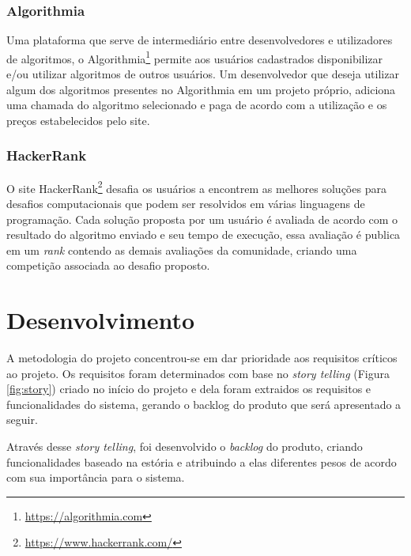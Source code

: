 \documentclass[tg]{mdtufsm}
\begin{document}
\subsection{Algorithmia}
Uma plataforma que serve de intermediário entre desenvolvedores e utilizadores de algoritmos, o Algorithmia\footnote{\url{https://algorithmia.com}} permite aos usuários cadastrados disponibilizar e/ou utilizar algoritmos de outros usuários. Um desenvolvedor que deseja utilizar algum dos algoritmos presentes no Algorithmia em um projeto próprio, adiciona uma chamada do algoritmo selecionado e paga de acordo com a utilização e os preços estabelecidos pelo site.

\subsection{HackerRank}
O site HackerRank\footnote{\url{https://www.hackerrank.com/}} desafia os usuários a encontrem as melhores soluções para desafios computacionais que podem ser resolvidos em várias linguagens de programação. Cada solução proposta por um usuário é avaliada de acordo com o resultado do algoritmo enviado e seu tempo de execução, essa avaliação é publica em um \emph{rank} contendo as demais avaliações da comunidade, criando uma competição associada ao desafio proposto.

\fi

\chapter{Desenvolvimento}


A metodologia do projeto concentrou-se em dar prioridade aos requisitos críticos ao projeto. Os requisitos foram determinados com base no \emph{story telling} (Figura \ref{fig:story}) criado no início do projeto e dela foram extraidos os requisitos e funcionalidades do sistema, gerando o backlog do produto que será apresentado a seguir.

Através desse \emph{story telling}, foi desenvolvido o \emph{backlog} do produto, criando funcionalidades baseado na estória e atribuindo a elas diferentes pesos de acordo com sua importância para o sistema.
\end{document}
